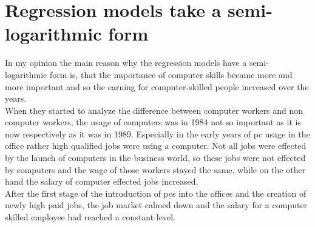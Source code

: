 
\chapter{Regression models take a semi-logarithmic form}

In my opinion the main reason why the regression models have a semi-logarithmic form is, that the importance of computer skills became more and more important and so the earning for computer-skilled people increased over the years.\\
When they started to analyze the difference between computer workers and non computer workers, the usage of computers was in 1984 not so important as it is now respectively as it was in 1989. Especially in the early years of pc usage in the office rather high qualified jobs were using a computer. Not all jobs were effected by the launch of computers in the business world, so these jobs were not effected by computers and the wage of those workers stayed the same, while on the other hand the salary of computer effected jobs increased. \\
After the first stage of the introduction of pcs into the offices and the creation of newly high paid jobs, the job market calmed down and the salary for a computer skilled employee had reached a constant level.\\
